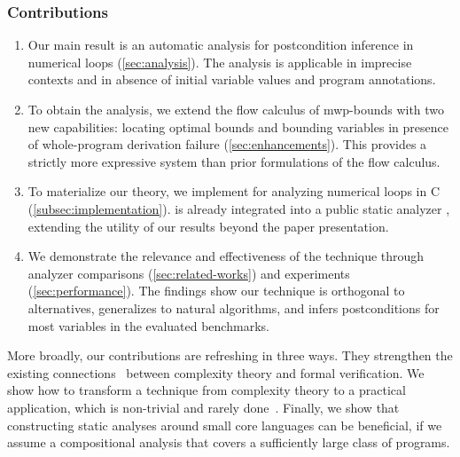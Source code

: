 \subsubsection{Contributions}
\label{subsec:contributions}

\begin{enumerate}

\item Our main result is an automatic analysis for postcondition inference in numerical loops (\autoref{sec:analysis}).
The analysis is applicable in imprecise contexts and in absence of initial variable values and program annotations.

\item To obtain the analysis, we extend the flow calculus of mwp-bounds with two new capabilities:
locating optimal bounds and bounding variables in presence of whole-program derivation failure (\autoref{sec:enhancements}).
This provides a {strictly more expressive system} than prior formulations of the flow calculus.

\item To materialize our theory, we implement \impl for analyzing numerical loops in C (\autoref{subsec:implementation}).
\impl is already integrated into a public static analyzer , extending the utility of our results beyond the paper presentation.

\item We demonstrate the relevance and effectiveness of the technique through
analyzer comparisons (\autoref{sec:related-works}) and experiments (\autoref{sec:performance}).
The findings show our technique is orthogonal to alternatives,
generalizes to natural algorithms, and infers postconditions for most variables in the evaluated benchmarks.

\end{enumerate}

More broadly, our contributions are refreshing in three ways.
They strengthen the existing connections~\cite{nguyen2017,nguyen2014} {between} complexity theory and formal verification.
We show how to transform a technique from complexity theory to a practical application, which is non-trivial and rarely done~\cite{moyen2017,aubert20222}.
Finally, we show that constructing static analyses around small core languages %
can be beneficial, if we assume a {compositional} analysis that covers a sufficiently large class of programs.

